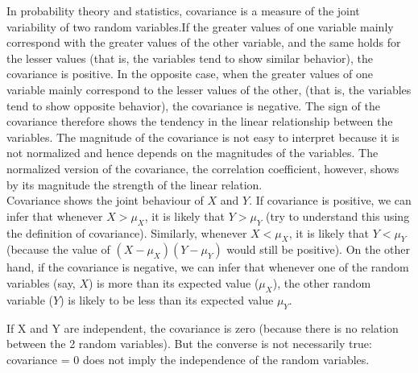 \begin{note}
\end{note}
In probability theory and statistics, covariance is a measure of the joint variability of two random variables.If the greater values of one variable mainly correspond with the greater values of the other variable, and the same holds for the lesser values (that is, the variables tend to show similar behavior), the covariance is positive. In the opposite case, when the greater values of one variable mainly correspond to the lesser values of the other, (that is, the variables tend to show opposite behavior), the covariance is negative. The sign of the covariance therefore shows the tendency in the linear relationship between the variables. The magnitude of the covariance is not easy to interpret because it is not normalized and hence depends on the magnitudes of the variables. The normalized version of the covariance, the correlation coefficient, however, shows by its magnitude the strength of the linear relation. \\ 
Covariance shows the joint behaviour of $X$ and $Y$. If covariance is positive, we can infer that whenever $X > \mu_X$, it is likely that $Y > \mu_Y$ (try to understand this using the definition of covariance). Similarly, whenever $X < \mu_X$, it is likely that $Y < \mu_Y$ (because the value of $(X - \mu_X)(Y - \mu_Y)$ would still be positive). On the other hand, if the covariance is negative, we can infer that whenever one of the random variables (say, $X$) is more than its expected value ($\mu_X$), the other random variable ($Y$) is likely to be less than its expected value $\mu_Y$.
\begin{note}
\end{note}
If X and Y are independent, the covariance is zero (because there is no relation between the 2 random variables). But the converse is not necessarily true: covariance = 0 does not imply the independence of the random variables.
\begin{note}
\end{note}
